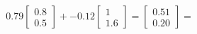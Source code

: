 \documentclass[preview]{standalone}
\begin{document}
\begin{align*}
0.79 \begin{bmatrix} 0.8 \\ 0.5 \end{bmatrix} + -0.12 \begin{bmatrix} 1 \\ 1.6 \end{bmatrix} = \begin{bmatrix} 0.51 \\ 0.20 \end{bmatrix} =
\end{align*}
\end{document}
